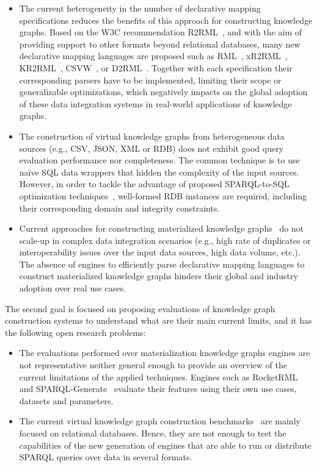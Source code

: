 \begin{itemize}
    \item The current heterogeneity in the number of declarative mapping specifications reduces the benefits of this approach for constructing knowledge graphs. Based on the W3C recommendation R2RML~\citep{R2RML}, and with the aim of providing support to other formats beyond relational databases, many new declarative mapping languages are proposed such as RML~\citep{dimou2014rml}, xR2RML~\citep{michel2015translation}, KR2RML~\citep{slepicka2015kr2rml}, CSVW~\citep{tennison2015model}, or D2RML~\citep{chortaras2018mapping}. Together with each specification their corresponding parsers have to be implemented, limiting their scope or generalizable optimizations, which negatively impacts on the global adoption of these data integration systems in real-world applications of knowledge graphs.

    \item The construction of virtual knowledge graphs from heterogeneous data sources (e.g., CSV, JSON, XML or RDB) does not exhibit good query evaluation performance nor completeness. The common technique is to use na\"ive SQL data wrappers that hidden the complexity of the input sources. However, in order to tackle the advantage of proposed SPARQL-to-SQL optimization techniques~\citep{priyatna2014formalisation,calvanese2017ontop}, well-formed RDB instances are required, including their corresponding domain and integrity constraints.

    \item Current approaches for constructing materialized knowledge graphs~\citep{csimcsek2019rocketrml,lefranccois2017sparql} do not scale-up in complex data integration scenarios (e.g., high rate of duplicates or interoperability issues over the input data sources, high data volume, etc.). The absence of engines to efficiently parse declarative mapping languages to construct materialized knowledge graphs hinders their global and industry adoption over real use cases.
\end{itemize}

The second goal is focused on proposing evaluations of knowledge graph construction systems to understand what are their main current limits, and it has the following open research problems:
\begin{itemize}
    \item The evaluations performed over materialization knowledge graphs engines are not representative neither general enough to provide an overview of the current limitations of the applied techniques. Engines such as RocketRML~\citep{csimcsek2019rocketrml} and SPARQL-Generate~\citep{lefranccois2017sparql} evaluate their features using their own use cases, datasets and parameters. 
    \item The current virtual knowledge graph construction benchmarks~\citep{lanti2015npd,bizer2009berlin} are mainly focused on relational databases. Hence, they are not enough to test the capabilities of the new generation of engines that are able to run or distribute SPARQL queries over data in several formats. 
\end{itemize}

